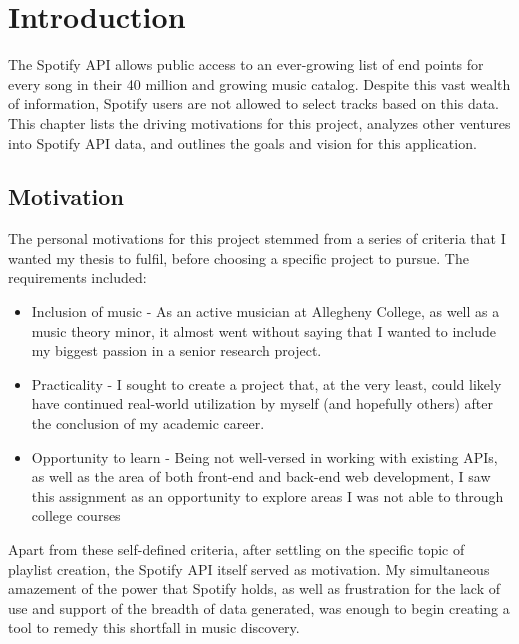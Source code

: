 %
%

\chapter{Introduction}\label{ch:intro} %

The Spotify API allows public access to an ever-growing list of end points
for every song in their 40 million and growing music catalog. Despite this vast
wealth of information, Spotify users are not allowed to select tracks based on this
data. This chapter lists the driving motivations for this project, analyzes other
ventures into Spotify API data, and outlines the goals and vision for this
application.
\section{Motivation} \label{sec:motivation}

The personal motivations for this project stemmed from a series of criteria that
I wanted my thesis to fulfil, before choosing a specific project to pursue. The
requirements included:
\begin{itemize}
  \item Inclusion of music - As an active musician at Allegheny College, as well
  as a music theory minor, it almost went without saying that I wanted to include
  my biggest passion in a senior research project.

  \item Practicality - I sought to create a project that, at the very least, could
  likely have continued real-world utilization by myself (and hopefully others)
  after the conclusion of my academic career.

  \item Opportunity to learn - Being not well-versed in working with existing APIs,
  as well as the area of both front-end and back-end web development, I saw this
  assignment as an opportunity to explore areas I was not able to through college
  courses
\end{itemize}

Apart from these self-defined criteria, after settling on the specific topic of playlist
creation, the Spotify API itself served as motivation. My simultaneous amazement of
the power that Spotify holds, as well as frustration for the lack of use and support
of the breadth of data generated, was enough to begin creating a tool to remedy
this shortfall in music discovery.

